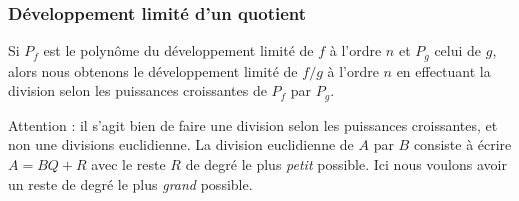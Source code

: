 \newcommand{\CaptionFigWUYooCISzeB}{Les développements limités d'ordre de plus en plus grand de la fonction de l'exemple \ref{ExKPBooJmdFvY}. La fonction est en bleu et les «approximations» sont en rouge.}


\subsubsection{Développement limité d'un quotient}

\begin{proposition}
    Si \( P_f\) est le polynôme du développement limité de \( f\) à l'ordre \( n\) et \( P_g\) celui de \( g\), alors nous obtenons le développement limité de \( f/g\) à l'ordre \( n\) en effectuant la division selon les puissances croissantes de \( P_f\) par \( P_g\).
\end{proposition}
Attention : il s'agit bien de faire une division selon les puissances croissantes, et non une divisions euclidienne. La division euclidienne de \( A\) par \( B\) consiste à écrire \( A=BQ+R\) avec le reste \( R\) de degré le plus \emph{petit} possible. Ici nous voulons avoir un reste de degré le plus \emph{grand} possible.

